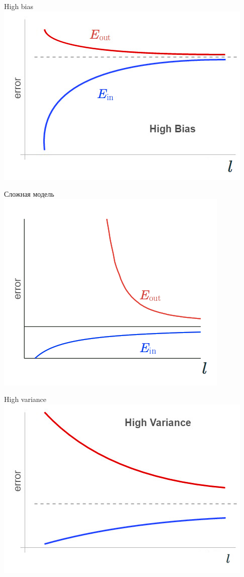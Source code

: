 \documentclass[10pt]{beamer}
\begin{document}
\begin{frame}{High bias}
  \centering
  \includegraphics[width=0.8 \textwidth, keepaspectratio]{images/high_bias}
\end{frame}

\begin{frame}{Сложная модель}
  \centering
  \includegraphics[width=0.8 \textwidth, keepaspectratio]{images/complex_model}
\end{frame}

\begin{frame}{High variance}
  \centering
  \includegraphics[width=0.8 \textwidth, keepaspectratio]{images/high_variance}
\end{frame}
\end{document}
